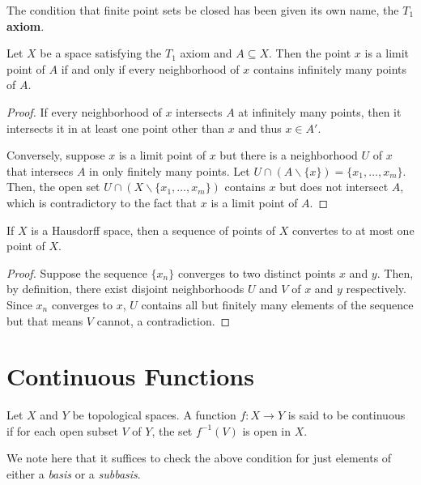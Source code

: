 The condition that finite point sets be closed has been given its own name, the \textbf{$T_1$ axiom}.

\begin{theorem}
    Let $X$ be a space satisfying the $T_1$ axiom and $A\subseteq X$. Then the point $x$ is a limit point of $A$ if and only if every neighborhood of $x$ contains infinitely many points of $A$.
\end{theorem}
\begin{proof}
    If every neighborhood of $x$ intersects $A$ at infinitely many points, then it intersects it in at least one point other than $x$ and thus $x\in A'$.
    
    Conversely, suppose $x$ is a limit point of $x$ but there is a neighborhood $U$ of $x$ that intersecs $A$ in only finitely many points. Let $U\cap(A\backslash\{x\}) = \{x_1,\ldots,x_m\}$. Then, the open set $U\cap(X\backslash\{x_1,\ldots,x_m\})$ contains $x$ but does not intersect $A$, which is contradictory to the fact that $x$ is a limit point of $A$.
\end{proof}

\begin{theorem}
    If $X$ is a Hausdorff space, then a sequence of points of $X$ convertes to at most one point of $X$.
\end{theorem}
\begin{proof}
    Suppose the sequence $\{x_n\}$ converges to two distinct points $x$ and $y$. Then, by definition, there exist disjoint neighborhoods $U$ and $V$ of $x$ and $y$ respectively. Since $x_n$ converges to $x$, $U$ contains all but finitely many elements of the sequence but that means $V$ cannot, a contradiction.
\end{proof}


\section{Continuous Functions}
\begin{definition}
    Let $X$ and $Y$ be topological spaces. A function $f:X\to Y$ is said to be continuous if for each open subset $V$ of $Y$, the set $f^{-1}(V)$ is open in $X$.
\end{definition}

We note here that it suffices to check the above condition for just elements of either a \textit{basis} or a \textit{subbasis}.

